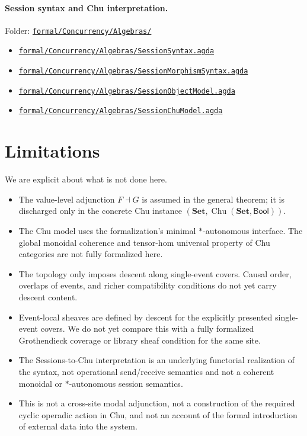 \documentclass[11pt]{article}
\newcommand{\Set}{\mathbf{Set}}
\newcommand{\Bool}{\mathsf{Bool}}
\newcommand{\Chu}{\operatorname{Chu}}
\newcommand{\RepoURL}{https://codeberg.org/doc2cog/hoapa/src/branch/main}
\newcommand{\RepoDir}[1]{\href{\RepoURL/#1}{\nolinkurl{#1/}}}
\newcommand{\RepoFile}[1]{\href{\RepoURL/#1}{\nolinkurl{#1}}}
\begin{document}
\paragraph{Session syntax and Chu interpretation.}
Folder: \RepoDir{formal/Concurrency/Algebras}
\begin{itemize}[leftmargin=1.4em,itemsep=2pt]
\item \RepoFile{formal/Concurrency/Algebras/SessionSyntax.agda}
\item \RepoFile{formal/Concurrency/Algebras/SessionMorphismSyntax.agda}
\item \RepoFile{formal/Concurrency/Algebras/SessionObjectModel.agda}
\item \RepoFile{formal/Concurrency/Algebras/SessionChuModel.agda}
\end{itemize}

\section*{Limitations}

We are explicit about what is not done here.
\begin{itemize}[leftmargin=1.4em,itemsep=2pt]
\item The value-level adjunction $F\dashv G$ is assumed in the general theorem;
it is discharged only in the concrete Chu instance
$(\Set,\Chu(\Set,\Bool))$.
\item The Chu model uses the formalization's minimal $*$-autonomous interface.
The global monoidal coherence and tensor-hom universal property of Chu
categories are not fully formalized here.
\item The topology only imposes descent along single-event covers. Causal order,
overlaps of events, and richer compatibility conditions do not yet carry descent
content.
\item Event-local sheaves are defined by descent for the explicitly presented
single-event covers. We do not yet compare this with a fully formalized
Grothendieck coverage or library sheaf condition for the same site.
\item The Sessions-to-Chu interpretation is an underlying functorial
realization of the syntax, not operational send/receive semantics and not a
coherent monoidal or $*$-autonomous session semantics.
\item This is not a cross-site modal adjunction, not a construction of the
required cyclic operadic action in Chu, and not an account of the formal
introduction of external data into the system.
\end{itemize}
\end{document}
